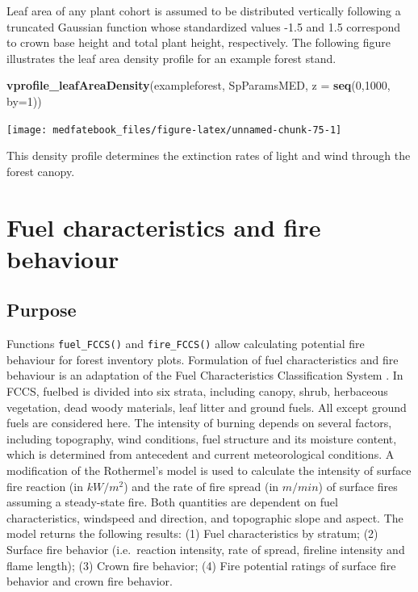\documentclass[]{book}
\newenvironment{Shaded}{\begin{snugshade}}{\end{snugshade}}
\newcommand{\KeywordTok}[1]{\textcolor[rgb]{0.13,0.29,0.53}{\textbf{#1}}}
\newcommand{\DataTypeTok}[1]{\textcolor[rgb]{0.13,0.29,0.53}{#1}}
\newcommand{\DecValTok}[1]{\textcolor[rgb]{0.00,0.00,0.81}{#1}}
\newcommand{\NormalTok}[1]{#1}
\begin{document}
Leaf area of any plant cohort is assumed to be distributed vertically following a truncated Gaussian function whose standardized values -1.5 and 1.5 correspond to crown base height and total plant height, respectively. The following figure illustrates the leaf area density profile for an example forest stand.

\begin{Shaded}
\begin{Highlighting}[]
\KeywordTok{vprofile_leafAreaDensity}\NormalTok{(exampleforest, SpParamsMED, }\DataTypeTok{z =} \KeywordTok{seq}\NormalTok{(}\DecValTok{0}\NormalTok{,}\DecValTok{1000}\NormalTok{, }\DataTypeTok{by=}\DecValTok{1}\NormalTok{))}
\end{Highlighting}
\end{Shaded}

\begin{center}\texttt{[image: medfatebook\_files/figure-latex/unnamed-chunk-75-1]} \end{center}

This density profile determines the extinction rates of light and wind through the forest canopy.

\hypertarget{fuel-characteristics-and-fire-behaviour}{%
\chapter{Fuel characteristics and fire behaviour}\label{fuel-characteristics-and-fire-behaviour}}

\hypertarget{purpose-1}{%
\section{Purpose}\label{purpose-1}}

Functions \texttt{fuel\_FCCS()} and \texttt{fire\_FCCS()} allow calculating potential fire behaviour for forest inventory plots. Formulation of fuel characteristics and fire behaviour is an adaptation of the Fuel Characteristics Classification System \citep[FCCS;][]{Prichard2013}. In FCCS, fuelbed is divided into six strata, including canopy, shrub, herbaceous vegetation, dead woody materials, leaf litter and ground fuels. All except ground fuels are considered here. The intensity of burning depends on several factors, including topography, wind conditions, fuel structure and its moisture content, which is determined from antecedent and current meteorological conditions. A modification of the Rothermel's \citeyearpar{Rothermel1972} model is used to calculate the intensity of surface fire reaction (in \(kW/m^2\)) and the rate of fire spread (in \(m/min\)) of surface fires assuming a steady-state fire. Both quantities are dependent on fuel characteristics, windspeed and direction, and topographic slope and aspect. The model returns the following results: (1) Fuel characteristics by stratum; (2) Surface fire behavior (i.e.~reaction intensity, rate of spread, fireline intensity and flame length); (3) Crown fire behavior; (4) Fire potential ratings of surface fire behavior and crown fire behavior.
\end{document}
